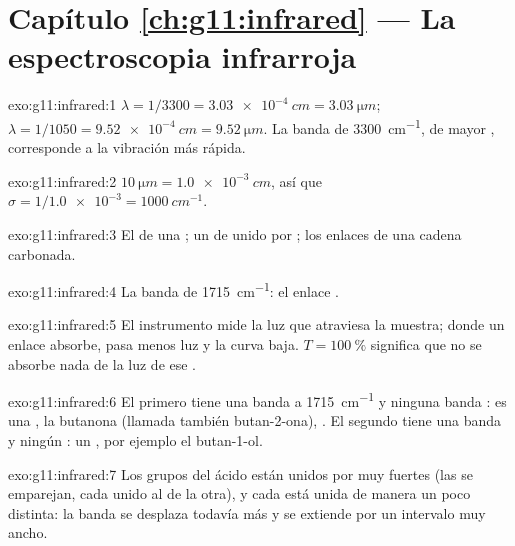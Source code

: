 \section*{Capítulo \ref{ch:g11:infrared} --- La espectroscopia infrarroja}

\begin{solution}{exo:g11:infrared:1}
$\lambda = 1/3300 = \qty{3.03e-4}{cm} = \qty{3.03}{\micro m}$;
$\lambda = 1/1050 = \qty{9.52e-4}{cm} = \qty{9.52}{\micro m}$. La banda de
\qty{3300}{cm^{-1}}, de mayor , corresponde a la vibración
más rápida.
\end{solution}

\begin{solution}{exo:g11:infrared:2}
$\qty{10}{\micro m} = \qty{1.0e-3}{cm}$, así que $\sigma = 1/\num{1.0e-3} =
\qty{1000}{cm^{-1}}$.
\end{solution}

\begin{solution}{exo:g11:infrared:3}
El  de una ; un  de  unido por ; los enlaces  de una cadena carbonada.
\end{solution}

\begin{solution}{exo:g11:infrared:4}
La banda de \qty{1715}{cm^{-1}}: el enlace .
\end{solution}

\begin{solution}{exo:g11:infrared:5}
El instrumento mide la luz que atraviesa la muestra; donde un enlace
absorbe, pasa menos luz y la curva baja. $T =
\qty{100}{\percent}$ significa que no se absorbe nada de la luz de ese
.
\end{solution}

\begin{solution}{exo:g11:infrared:6}
El primero tiene una banda  a \qty{1715}{cm^{-1}} y ninguna
banda : es una , la butanona (llamada también
butan-2-ona), . El segundo tiene una banda  y
ningún : un , por ejemplo el butan-1-ol.
\end{solution}

\begin{solution}{exo:g11:infrared:7}
Los grupos  del ácido están unidos por  muy
fuertes (las  se emparejan, cada  unido al  de
la otra), y cada  está unida de manera un poco distinta: la
banda se desplaza todavía más y se extiende por un intervalo muy ancho.
\end{solution}

